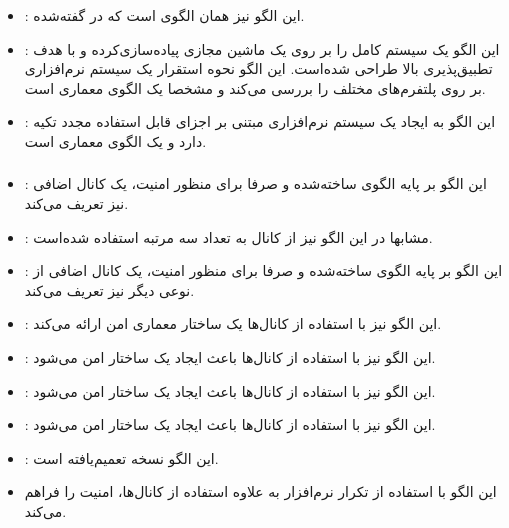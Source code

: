 \subsubsection{}
\begin{itemize}
\item {}: %
این الگو نیز همان الگوی  است
که در \cite{ref6} گفته‌شده.
\item {}: %
این الگو یک سیستم کامل را بر روی یک ماشین مجازی پیاده‌سازی‌کرده و
با هدف تطبیق‌پذیری بالا طراحی شده‌است. این الگو نحوه استقرار یک سیستم
نرم‌افزاری بر روی پلتفرم‌های مختلف را بررسی می‌کند و مشخصا یک الگوی معماری است.
\item {}: %
این الگو به ایجاد یک سیستم نرم‌افزاری مبتنی بر اجزای قابل استفاده مجدد تکیه دارد
و یک الگوی معماری است.
\end{itemize}

\subsubsection{}
\begin{itemize}
\item {}: %
این الگو بر پایه الگوی  ساخته‌شده
و صرفا برای منظور امنیت، یک کانال اضافی نیز تعریف می‌کند.
\item {}: %
مشابها در این الگو نیز از کانال به تعداد سه مرتبه استفاده شده‌است.
\item {}: %
این الگو بر پایه الگوی  ساخته‌شده
و صرفا برای منظور امنیت، یک کانال اضافی از نوعی دیگر نیز تعریف می‌کند.
\item {}: %
این الگو نیز با استفاده از کانال‌ها یک ساختار معماری امن ارائه می‌کند.
\item {}: %
این الگو نیز با استفاده از کانال‌ها باعث ایجاد یک ساختار امن می‌شود.
\item {}: %
این الگو نیز با استفاده از کانال‌ها باعث ایجاد یک ساختار امن می‌شود.
\item {}: %
این الگو نیز با استفاده از کانال‌ها باعث ایجاد یک ساختار امن می‌شود.
\item {}: %
این الگو نسخه تعمیم‌یافته
 است.
\item {} %
این الگو با استفاده از تکرار نرم‌افزار به علاوه استفاده از کانال‌ها، امنیت را
فراهم می‌کند.
\end{itemize}

